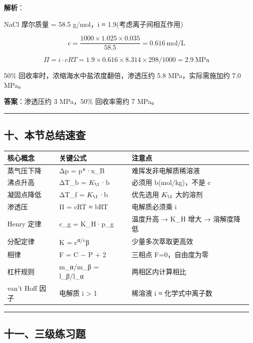\documentclass[a4paper,11pt]{ctexart}
\newcounter{none}
\begin{document}
\textbf{解析}：

NaCl 摩尔质量 = 58.5 g/mol，i ≈ 1.9(考虑离子间相互作用)

\[c = \frac{1000 \times 1.025 \times 0.035}{58.5} = 0.616\ \mathrm{mol/L}\]

\[\Pi = i \cdot cRT = 1.9 \times 0.616 \times 8.314 \times 298 / 1000 = 2.9\ \mathrm{MPa}\]

50\% 回收率时，浓缩海水中盐浓度翻倍，渗透压约 5.8 MPa，实际需施加约 7.0 MPa。

\textbf{答案}：渗透压约 3 MPa，50\% 回收率需约 7 MPa。

\begin{center}\rule{0.5\linewidth}{0.5pt}\end{center}

\subsection{十、本节总结速查}\label{ux5341ux672cux8282ux603bux7ed3ux901fux67e5}

{\def\LTcaptype{none} %
\begin{longtable}[]{@{}lll@{}}
\toprule\noalign{}
核心概念 & 关键公式 & 注意点 \\
\midrule\noalign{}
\endhead
\bottomrule\noalign{}
\endlastfoot
蒸气压下降 & Δp = p*·x\_B & 难挥发非电解质稀溶液 \\
沸点升高 & ΔT\_b = \(K_{\1}\)·b & 必须用 b(mol/kg)，不是 c \\
凝固点降低 & ΔT\_f = \(K_{\1}\)·b & 优先选用 \(K_{\1}\) 大的溶剂 \\
渗透压 & Π = cRT ≈ bRT & 电解质必须乘 i \\
Henry 定律 & c\_g = K\_H·p\_g & 温度升高 → K\_H 增大 → 溶解度降低 \\
分配定律 & K = c\textsuperscript{α/c}β & 少量多次萃取更高效 \\
相律 & F = C − P + 2 & 三相点 F=0，自由度为零 \\
杠杆规则 & m\_α/m\_β = l\_β/l\_α & 两相区内计算相比 \\
van't Hoff 因子 & 电解质 i \textgreater{} 1 & 稀溶液 i ≈ 化学式中离子数 \\
\end{longtable}
}

\begin{center}\rule{0.5\linewidth}{0.5pt}\end{center}

\subsection{十一、三级练习题}\label{ux5341ux4e00ux4e09ux7ea7ux7ec3ux4e60ux9898}
\end{document}
